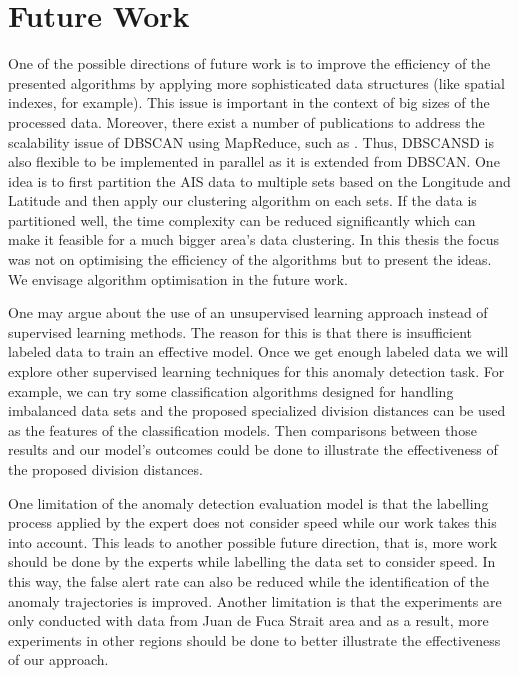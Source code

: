 \documentclass[12pt,glossary]{dalcsthesis}
\begin{document}




\section{Future Work}

One of the possible directions of future work is to improve the efficiency of the presented algorithms by applying more sophisticated data structures (like spatial indexes, for example). This issue is important in the context of big sizes of the processed data. Moreover, there exist a number of publications to address the scalability issue of DBSCAN using MapReduce, such as \cite{mrdbscan}\cite{pdbscan}. Thus, DBSCANSD is also flexible to be implemented in parallel as it is extended from DBSCAN. One idea is to first partition the AIS data to multiple sets based on the Longitude and Latitude and then apply our clustering algorithm on each sets. If the data  is partitioned well, the time complexity can be reduced significantly which can make it feasible for a much bigger area's data clustering. In this thesis the focus was not on optimising the efficiency of the algorithms but to present the ideas. We envisage algorithm optimisation in the future work.

One may argue about the use of an unsupervised learning approach instead of supervised learning methods. The reason for this is that there is  insufficient labeled data to train an effective model. Once we get enough labeled data we will explore other supervised learning techniques for this anomaly detection task. For example, we can try some classification algorithms designed for handling imbalanced data sets and the proposed specialized division distances can be used as the features of the classification models.  Then comparisons between those results and our model's outcomes could be done to illustrate the effectiveness of the proposed division distances.

One limitation of the  anomaly detection evaluation model is that the labelling process applied by the expert does not consider speed while our work takes this into account. This leads to another possible future direction, that is, more work should be done by the experts while labelling the data set to consider speed. In this way, the false alert rate can also be reduced while the identification of the anomaly trajectories is improved. Another limitation is that the experiments are only conducted with data from Juan de Fuca Strait area and as a result, more experiments in other regions should be done to better illustrate the effectiveness of our approach.
\end{document}
